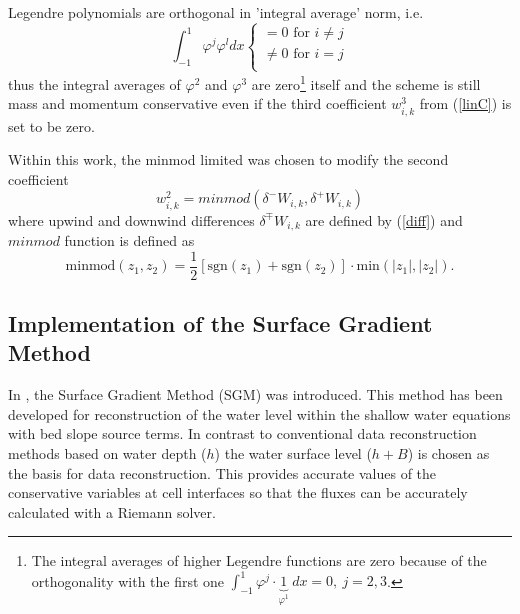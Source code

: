   Legendre polynomials are orthogonal in 'integral average' norm, i.e.
\begin{equation}
\int_{-1}^{1} \varphi^j \varphi^l dx \begin{cases}
=0 \text{ for }i\neq j\\
\neq 0 \text{ for }i=j\\
\end{cases} 
\end{equation}
thus the integral averages of $\varphi^2$ and $\varphi^3$ are zero\footnote{The integral averages of higher Legendre functions are zero because of the orthogonality with the first one $\int_{-1}^{1} \varphi^{j}\cdot \underbrace{1}\limits_{\varphi^{1}} \ dx=0, \ j=2,3$.} itself and the scheme is still mass and momentum conservative even if the third coefficient $w_{i,k}^{3}$ from (\ref{linC}) is set to be zero.


 Within this work, the minmod limited was chosen to modify the second coefficient
\begin{equation}\label{clasLim}
w_{i,k}^{2}=minmod(\delta^- W_{i,k},\delta^+ W_{i,k})
\end{equation}
where upwind and downwind differences $\delta^\mp W_{i,k}$ are defined by (\ref{diff}) and $minmod$ function is defined as \cite{Nessyahu}
\begin{equation}\label{limiter}
\text{minmod}(z_1,z_2)=\frac{1}{2}[\text{sgn}(z_1) + \text{sgn}(z_2)] \cdot \text{min}(|z_1|, |z_2|).
\end{equation}

\subsection{Implementation of the Surface Gradient Method}
In \cite{Zhou2001}, the Surface Gradient Method (SGM) was introduced. This method has been developed for reconstruction of the water level within the shallow water equations with bed slope source terms. In contrast
to conventional data reconstruction methods based on water depth ($h$) the
water surface level ($h+B$) is chosen as the basis for data reconstruction. This provides
accurate values of the conservative variables at cell interfaces so that the fluxes can
be accurately calculated with a Riemann solver.

